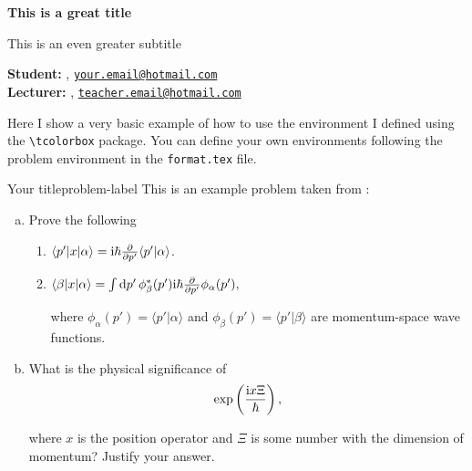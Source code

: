





\begin{Large}
    \textsf{\textbf{This is a great title}}
    
    This is an even greater subtitle
\end{Large}

\vspace{1ex}

\textsf{\textbf{Student:}} , \href{mailto:your.email@hotmail.com}{\texttt{your.email@hotmail.com}}\\
\textsf{\textbf{Lecturer:}} , \href{mailto:teacher.email@hotmail.com}{\texttt{teacher.email@hotmail.com}}


\vspace{2ex}

Here I show a very basic example of how to use the  environment I defined using the \verb|\tcolorbox| package. You can define your own environments following the problem environment in the \texttt{format.tex} file.

\begin{problem}{Your title}{problem-label}
This is an example problem taken from \cite{Sakurai2020}:

\begin{enumerate}[(a)]
    \item Prove the following
    \begin{enumerate}[label = (\roman*)]
        \item $\langle p' | x | \alpha \rangle = \mathrm{i} \hbar \pdv{}{p'} \langle p' | \alpha \rangle$.

        \item $\langle \beta | x | \alpha \rangle = \int \dd{p'} \phi_{\beta}^{*} (p') \mathrm{i} \hbar \pdv{}{p'} \phi_{\alpha} (p'),$

        where $\phi_{\alpha}(p') = \langle p' | \alpha \rangle$ and $\phi_{\beta}(p') = \langle p' | \beta \rangle$ are momentum-space wave functions.
    \end{enumerate}

    \item What is the physical significance of 
    \[
    \exp\left(\dfrac{\mathrm{i} x \Xi}{\hbar}\right),
    \]

    where $x$ is the position operator and $\Xi$ is some number with the dimension of momentum? Justify your answer.
\end{enumerate}
\end{problem}

